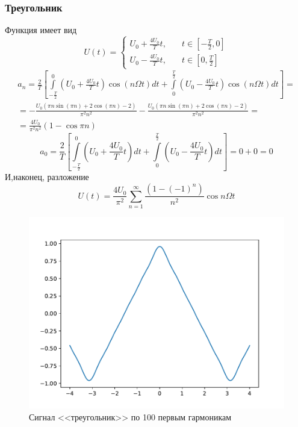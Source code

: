 \subsubsection{Треугольник}
Функция имеет вид 
\begin{equation}
	U(t)=\left\{
	\begin{aligned}
		U_0+\frac{4U_0}{T}t,\quad &t\in [-\frac{T}{2},0]\\
		U_0-\frac{4U_0}{T}t,\quad &t\in[0, \frac{T}{2}]
	\end{aligned}
	\right.
\end{equation}
\begin{gather}
	a_n=\frac{2}{T}\left[\int\limits^0_{-\frac{T}{2}}(U_0+\frac{4U_0}{T}t)\cos(n\Omega t)dt+\int\limits_0^{\frac{T}{2}}(U_0-\frac{4U_0}{T}t)\cos(n\Omega t)dt \right]=\\=
	-\frac{U_0 (\pi  n \sin (\pi  n)+2 \cos (\pi  n)-2)}{\pi ^2 n^2}-\frac{U_0 (\pi  n \sin (\pi  n)+2 \cos (\pi  n)-2)}{\pi ^2 n^2}=\\=
	\frac{4U_0}{\pi^2 n^2}(1-\cos{\pi n})
\end{gather}
\begin{equation}
	a_0=\frac{2}{T}\left[\int\limits_{-\frac{T}{2}}^0 (U_0+\frac{4U_0}{T}t)dt + \int\limits_0^{\frac{T}{2}} (U_0-\frac{4U_0}{T}t)dt \right]=0+0=0
\end{equation}
И,наконец, разложение
\begin{equation}
	U(t)=\frac{4U_0}{\pi^2}\sum_{n=1}^{\infty}\frac{(1-(-1)^n)}{n^2}\cos{n\Omega t}
\end{equation}
\begin{figure}[tb]
	\centering
	\includegraphics[]{plot/triangle}
	\caption{Сигнал <<треугольник>> по 100 первым гармоникам}
	\label{fig:figure1}
\end{figure}

